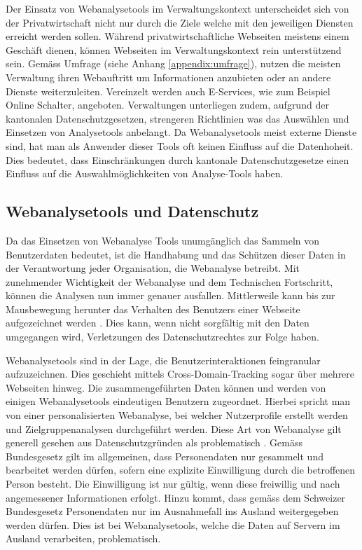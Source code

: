 Der Einsatz von Webanalysetools im Verwaltungskontext unterscheidet sich von der Privatwirtschaft nicht nur durch die Ziele welche mit den jeweiligen Diensten erreicht werden sollen. Während privatwirtschaftliche Webseiten meistens einem Geschäft dienen, können Webseiten im Verwaltungskontext rein unterstützend sein. Gemäss Umfrage (siehe Anhang \ref{appendix:umfrage}), nutzen die meisten Verwaltung ihren Webauftritt um Informationen anzubieten oder an andere Dienste weiterzuleiten. Vereinzelt werden auch E-Services, wie zum Beispiel Online Schalter, angeboten. Verwaltungen unterliegen zudem, aufgrund der kantonalen Datenschutzgesetzen, strengeren Richtlinien was das Auswählen und Einsetzen von Analysetools anbelangt. Da Webanalysetools meist externe Dienste sind, hat man als Anwender dieser Tools oft keinen Einfluss auf die Datenhoheit. Dies bedeutet, dass Einschränkungen durch kantonale Datenschutzgesetze einen Einfluss auf die Auswahlmöglichkeiten von Analyse-Tools haben.

\subsection{Webanalysetools und Datenschutz}
Da das Einsetzen von Webanalyse Tools unumgänglich das Sammeln von Benutzerdaten bedeutet, ist die Handhabung und das Schützen dieser Daten in der Verantwortung jeder Organisation, die Webanalyse betreibt. Mit zunehmender Wichtigkeit der Webanalyse und dem Technischen Fortschritt, können die Analysen nun immer genauer ausfallen. Mittlerweile kann bis zur Mausbewegung herunter das Verhalten des Benutzers einer Webseite aufgezeichnet werden \parencite[S. 1]{EcommerceUndDatenschutz}. Dies kann, wenn nicht sorgfältig mit den Daten umgegangen wird,  Verletzungen des Datenschutzrechtes zur Folge haben.

Webanalysetools sind in der Lage, die Benutzerinteraktionen feingranular aufzuzeichnen. Dies geschieht mittels Cross-Domain-Tracking sogar über mehrere Webseiten hinweg. Die zusammengeführten Daten können und werden von einigen Webanalysetools eindeutigen Benutzern zugeordnet. Hierbei spricht man von einer personalisierten Webanalyse, bei welcher Nutzerprofile erstellt werden und Zielgruppenanalysen durchgeführt werden. Diese Art von Webanalyse gilt generell gesehen aus Datenschutzgründen als problematisch \parencite[S. 2]{EcommerceUndDatenschutz}. Gemäss Bundesgesetz \parencite[§§ 4 Abs. 5]{SDSG} gilt im allgemeinen, dass Personendaten nur gesammelt und bearbeitet werden dürfen, sofern eine explizite Einwilligung durch die betroffenen Person besteht. Die Einwilligung ist nur gültig, wenn diese freiwillig und nach angemessener Informationen erfolgt. Hinzu kommt, dass gemäss dem Schweizer Bundesgesetz \parencite[§§ 6 Abs. 1]{SDSG} Personendaten nur im Ausnahmefall ins Ausland weitergegeben werden dürfen. Dies ist bei Webanalysetools, welche die Daten auf Servern im Ausland verarbeiten, problematisch.

